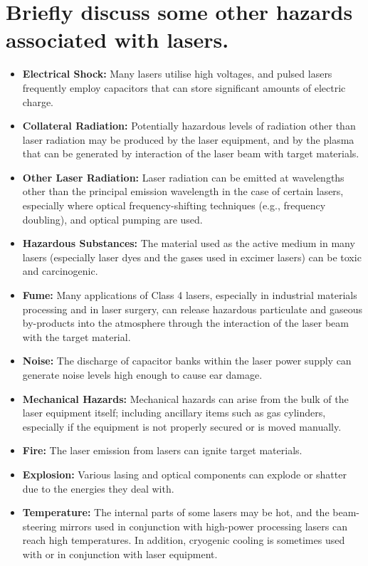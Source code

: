 \documentclass[a4paper]{scrartcl}
\begin{document}
\section{Briefly discuss some other hazards associated with lasers.}
\begin{itemize}
    \item \textbf{Electrical Shock:} Many lasers utilise high voltages, and pulsed lasers frequently employ capacitors that can store significant amounts of electric charge.
    \item \textbf{Collateral Radiation:} Potentially hazardous levels of radiation other than laser radiation may be produced by the laser equipment, and by the plasma that can be generated by interaction of the laser beam with target materials.
    \item \textbf{Other Laser Radiation:} Laser radiation can be emitted at wavelengths other than the principal emission wavelength in the case of certain lasers, especially where optical frequency-shifting techniques (e.g., frequency doubling), and optical pumping are used.
    \item \textbf{Hazardous Substances:} The material used as the active medium in many lasers (especially laser dyes and the gases used in excimer lasers) can be toxic and carcinogenic.
    \item \textbf{Fume:} Many applications of Class 4 lasers, especially in industrial materials processing and in laser surgery, can release hazardous particulate and gaseous by-products into the atmosphere through the interaction of the laser beam with the target material.
    \item \textbf{Noise:} The discharge of capacitor banks within the laser power supply can generate noise levels high enough to cause ear damage.
    \item \textbf{Mechanical Hazards:} Mechanical hazards can arise from the bulk of the laser equipment itself; including ancillary items such as gas cylinders, especially if the equipment is not properly secured or is moved manually.
    \item \textbf{Fire:} The laser emission from lasers can ignite target materials.
    \item \textbf{Explosion:} Various lasing and optical components can explode or shatter due to the energies they deal with.
    \item \textbf{Temperature:} The internal parts of some lasers may be hot, and the beam-steering mirrors used in conjunction with high-power processing lasers can reach high temperatures. In addition, cryogenic cooling is sometimes used with or in conjunction with laser equipment.
\end{itemize}
\end{document}
